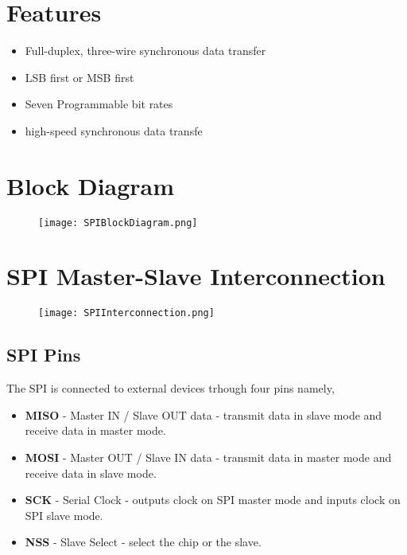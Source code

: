 \documentclass{article}
\begin{document}

\section{Features}
\begin{itemize}
    \item Full-duplex, three-wire synchronous data transfer
    \item LSB first or MSB first
    \item Seven Programmable bit rates
    \item high-speed synchronous data transfe
\end{itemize}

\section{Block Diagram}
\begin{figure}[H]
    \centering
    \texttt{[image: SPIBlockDiagram.png]}
\end{figure}

\section{SPI Master-Slave Interconnection}
\begin{figure}[H]
    \centering
    \texttt{[image: SPIInterconnection.png]}
\end{figure}
\subsection{SPI Pins}
\quad The SPI is connected to external devices trhough four pins namely,
\begin{itemize}
	\item \textbf{MISO} - Master IN / Slave OUT data - transmit data in slave mode and receive data in master mode.
	\item \textbf{MOSI} - Master OUT / Slave IN data - transmit data in master mode and receive data in slave mode.
	\item \textbf{SCK} - Serial Clock - outputs clock on SPI master mode and inputs clock on SPI slave mode.
	\item \textbf{NSS} - Slave Select - select the chip or the slave.
\end{itemize}
\end{document}
